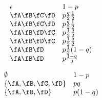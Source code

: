 \begin{displaymath}
  \begin{array}{ll}
    \epsilon & 1-p\\
    \fA\fB\fC\fD & p\frac{q}{2}\frac{1}{2}\\
    \fA\fB\fC\fD & p\frac{q}{2}\frac{1}{2}\\
    \fA\fB\fD\fC & p\frac{1}{2}\frac{q}{2}\\
    \fA\fB\fD\fC & p\frac{1}{2}\frac{q}{2}\\
    \fA\fB\fD & p\frac{1}{2}(1-q)\\
    \fA\fB\fD & p\frac{1-q}{2}
  \end{array}
\end{displaymath}

\begin{displaymath}
  \begin{array}{ll}
    \emptyset & 1-p\\
    \{\fA,\fB,\fC,\fD\} & pq\\
    \{\fA,\fB,\fD\} & p(1-q)\\
  \end{array}
\end{displaymath}

